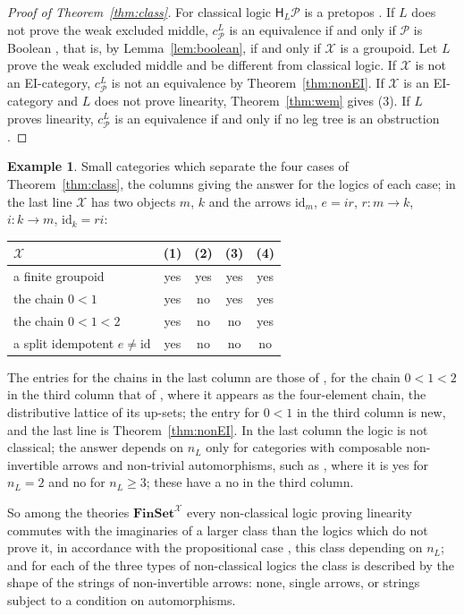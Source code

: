 \documentclass[11pt]{amsart}
\theoremstyle{definition}
\newtheorem{ex}[thm]{Example}
\newcommand{\Fin}{\mathbf{FinSet}}
\newcommand{\HH}{\mathsf H}
\newcommand{\cX}{\mathcal X}
\newcommand{\cP}{\mathcal P}
\newcommand{\id}{\mathrm{id}}
\begin{document}
\begin{proof}[Proof of Theorem~\ref{thm:class}]
For classical logic $\HH_L\cP$ is a pretopos \cite[Prop.~5.3]{Strings}.
If $L$ does not prove the weak excluded middle, $c^L_\cP$ is an
equivalence if and only if $\cP$ is Boolean
\cite[Thm.~1.1(1)]{Interm}, that is, by Lemma~\ref{lem:boolean}, if and
only if $\cX$ is a groupoid. Let $L$ prove the weak excluded middle and
be different from classical logic. If $\cX$ is not an EI-category,
$c^L_\cP$ is not an equivalence by Theorem~\ref{thm:nonEI}. If $\cX$ is
an EI-category and $L$ does not prove linearity, Theorem~\ref{thm:wem}
gives (3). If $L$ proves linearity, $c^L_\cP$ is an equivalence if and
only if no leg tree is an obstruction \cite[Thm.~1.1,
Thm.~6.15]{Strings}.
\end{proof}

\begin{ex}\label{ex:small}
Small categories which separate the four cases of
Theorem~\ref{thm:class}, the columns giving the answer for the logics
of each case; in the last line
$\cX$ has two objects $m$, $k$ and the arrows $\id_m$, $e=ir$,
$r\colon m\to k$, $i\colon k\to m$, $\id_k=ri$:
\begin{center}
\begin{tabular}{l@{\ \ }c@{\ \ }c@{\ \ }c@{\ \ }c}
$\cX$&(1)&(2)&(3)&(4)\\\hline
a finite groupoid&yes&yes&yes&yes\\
the chain $0<1$&yes&no&yes&yes\\
the chain $0<1<2$&yes&no&no&yes\\
a split idempotent $e\ne\id$&yes&no&no&no
\end{tabular}
\end{center}
The entries for the chains in the last column are those of
\cite[Thm.~1.1(3)]{Interm}, for the chain $0<1<2$ in the third column
that of \cite[Thm.~1.1(2)]{Interm}, where it appears as the
four-element chain, the distributive lattice of its up-sets; the entry
for $0<1$ in the third column is new, and the last line is
Theorem~\ref{thm:nonEI}. In the last column the logic is not
classical; the answer depends on $n_L$ only for categories with
composable non-invertible arrows and non-trivial automorphisms, such
as \cite[Ex.~6.8]{Strings}, where it is yes for $n_L=2$ and no for
$n_L\ge3$; these have a no in the third column.
\end{ex}

So among the theories $\Fin^{\cX}$ every non-classical logic proving
linearity commutes with the imaginaries of a larger class than the
logics which do not prove it, in accordance with the propositional
case \cite{Interm}, this class depending on $n_L$; and for each of
the three types of non-classical logics the class is described by the
shape of the strings of non-invertible arrows: none, single arrows,
or strings subject to a condition on automorphisms.
\end{document}
